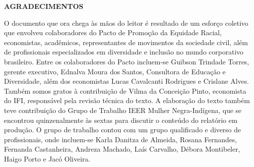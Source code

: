 \begin{center}
    \large
    \textbf{AGRADECIMENTOS}
\end{center}
\begingroup
\small
\begin{spacing}{1.0}

\par O documento que ora chega às mãos do leitor é resultado de um esforço coletivo que envolveu colaboradores do Pacto de Promoção da Equidade Racial, economistas, acadêmicos,  representantes de movimentos da sociedade civil, além de profissionais especializados em diversidade e inclusão no mundo corporativo brasileiro. Entre os colaboradores do Pacto incluem-se Guibson Trindade Torres, gerente executivo, Ednalva Moura dos Santos, Consultora de Educação e Diversidade, além dos economistas Lucas Cavalcanti Rodrigues e Crislane Alves. Também somos gratos à contribuição de Vilma da Conceição Pinto, economista do IFI, responsável pela revisão técnica do texto. A elaboração do texto também teve contribuição do Grupo de Trabalho IEER Mulher Negra-Indígena, que se encontrou quinzenalmente às sextas para discutir o conteúdo do relatório em produção. O grupo de trabalho contou com um grupo qualificado e diverso de profissionais, onde incluem-se Karla Danitza de Almeida, Rosana Fernandes, Fernanda Castanheira, Andreza Machado, Laís Carvalho, Débora Montibeler, Haigo Porto e Jacó Oliveira.

\end{spacing}

\endgroup
\thispagestyle{empty}
\clearpage